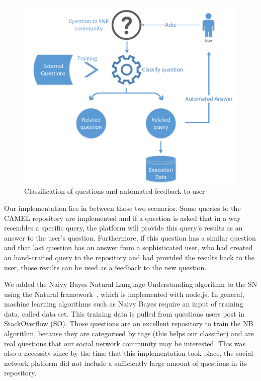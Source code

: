 \begin{figure}[h]
	\centering
	\includegraphics[width=1\textwidth]{./fig/Decision_making.pdf}
	\caption{Classification of questions and automated feedback to user}	
	\label{fig:auto_classification}
\end{figure}

Our implementation lies in between those two scenarios. Some queries to the CAMEL repository are implemented and if a question is asked that in a way resembles a specific query, the platform will provide this query's results as an answer to the user's question. Furthermore, if this question has a similar question and that last question has an answer from a sophisticated user, who had created an hand-crafted query to the repository and had provided the results back to the user, those results can be used as a feedback to the new question. 

We added the Naivy Bayes Natural Language Understanding algorithm to the SN using the Natural framework~\cite{nodenatural_url}, which is implemented with node.js. In general, machine learning algorithms such as Naivy Bayes require an input of training data, called data set. This training data is pulled from questions users post in StackOverflow (SO). Those questions are an excellent repository to train the NB algorithm, because they are categorised by tags (this helps our classifier) and are real questions that our social network community may be interested. This was also a necessity since by the time that this implementation took place, the social network platform did not include a sufficiently large amount of questions in its repository.

